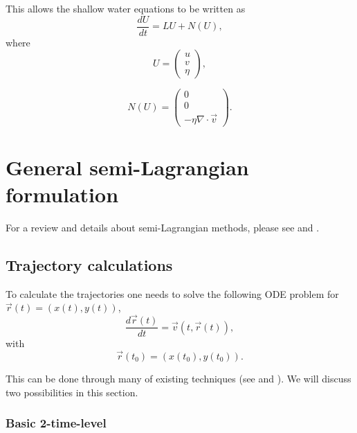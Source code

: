 \documentclass[10pt,a4paper]{article}
\begin{document}
 This allows the shallow water equations to be written as
 \begin{equation}
\frac{dU}{dt}=LU+N(U), 
 \end{equation}
 where 
 \begin{equation}
 U=\left(\begin{array}{c}
  u\\
 v\\
 \eta  
\end{array}\right),
 \end{equation}
 
 \begin{equation}
 N(U)=\left(\begin{array}{c}
  0\\
 0\\
 -\eta \nabla\cdot \vec{v}  
\end{array}\right).
 \end{equation} 




\section{General semi-Lagrangian formulation}

For a review and details about semi-Lagrangian methods, please see \cite{Staniforth1991} and \cite{Durran2010}. 

\subsection{Trajectory calculations}

To calculate the trajectories one needs to solve the following ODE problem for $\vec{r}(t)=(x(t), y(t))$,
\begin{equation}
\frac{d \vec{r}(t)}{dt} = \vec{v}(t, \vec{r}(t)),
\end{equation}
with 
\begin{equation}
\vec{r}(t_0) = (x(t_0), y(t_0)).
\end{equation}

This can be done through many of existing techniques (see \cite{Staniforth1991} and \cite{Durran2010}).  We will discuss two possibilities in this section.

\subsubsection*{Basic 2-time-level}
\end{document}
